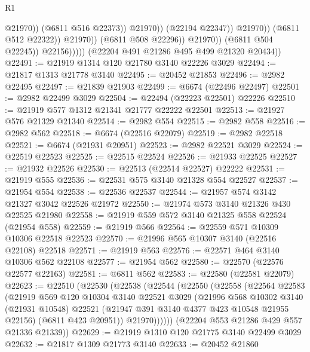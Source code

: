 \begin{lexlean}{R1}
\begin{coremodule}
                                              @21970))
                                          (@6811 @516 @22373))
                                        @21970))
                                    (@22194 @22347))
                                  @21970))
                              (@6811 @512 @22322))
                            @21970))
                        (@6811 @508 @22296))
                      @21970))
                  (@6811 @504 @22245))
                @22156)))))
      (@22204 @491 @21286 @495 @499 @21320 @20434))
@22491 := @21919 @1314 @120 @21780 @3140 @22226 @3029
@22494 := @21817 @1313 @21778 @3140
@22495 := @20452 @21853
@22496 := @2982 @22495
@22497 := @21839 @21903
@22499 := @6674 (@22496 @22497)
@22501 := @2982 @22499 @3029
@22504 := @22494 (@22223 @22501) @22226
@22510 := @21919 @577 @1312 @21341 @21777 @22222 @22501
@22513 := @21927 @576 @21329 @21340
@22514 := @2982 @554
@22515 := @2982 @558
@22516 := @2982 @562
@22518 := @6674 (@22516 @22079)
@22519 := @2982 @22518
@22521 := @6674 (@21931 @20951)
@22523 := @2982 @22521 @3029
@22524 := @22519 @22523
@22525 := @22515 @22524
@22526 := @21933 @22525
@22527 := @21932 @22526
@22530 := @22513 (@22514 @22527) @22222
@22531 := @21919 @555
@22536 := @22531 @575 @3140 @21328 @554 @22527
@22537 := @21954 @554
@22538 := @22536 @22537
@22544 := @21957 @574 @3142 @21327 @3042 @22526 @21972
@22550 := @21974 @573 @3140 @21326 @430 @22525 @21980
@22558 := @21919 @559 @572 @3140 @21325 @558 @22524 (@21954 @558)
@22559 := @21919 @566
@22564 := @22559 @571 @10309 @10306 @22518 @22523
@22570 := @21996 @565 @10307 @3140 (@22516 @22108) @22518
@22571 := @21919 @563
@22576 := @22571 @464 @3140 @10306 @562 @22108
@22577 := @21954 @562
@22580 := @22570 (@22576 @22577 @22163)
@22581 := @6811 @562
@22583 := @22580 (@22581 @22079)
@22623 := @22510
    (@22530
      (@22538
        (@22544
          (@22550
            (@22558
              (@22564
                @22583
                (@21919
                  @569
                  @120
                  @10304
                  @3140
                  @22521
                  @3029
                  (@21996
                    @568
                    @10302
                    @3140
                    (@21931 @10548)
                    @22521
                    (@21947 @391 @3140 @4377 @423 @10548 @21955 @22156)
                    (@6811 @423 @20951))
                  @21970))))))
      (@22204 @553 @21286 @429 @557 @21336 @21339))
@22629 := @21919 @1310 @120 @21775 @3140 @22499 @3029
@22632 := @21817 @1309 @21773 @3140
@22633 := @20452 @21860

\end{coremodule}
\end{lexlean}
